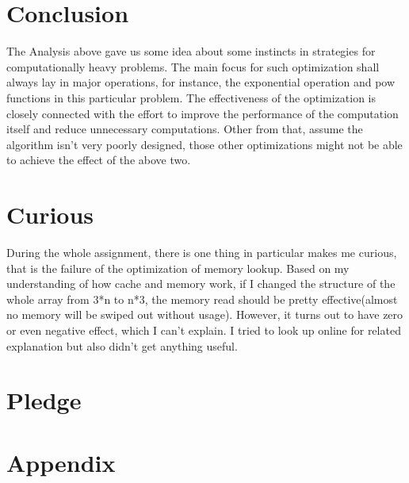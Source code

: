 \documentclass{cs4444}
\begin{document}
	   
\section{Conclusion}
	The Analysis above gave us some idea about some instincts in strategies for computationally heavy problems. The main focus for such optimization shall always lay in major operations, for instance, the exponential operation and pow functions in this particular problem. The effectiveness of the optimization is closely connected with the effort to improve the performance of the computation itself and reduce unnecessary computations. Other from that, assume the algorithm isn't very poorly designed, those other optimizations might not be able to achieve the effect of the above two.

\section{Curious}
	During the whole assignment, there is one thing in particular makes me curious, that is the failure of the optimization of memory lookup. Based on my understanding of how cache and memory work, if I changed the structure of the whole array from 3*n to n*3, the memory read should be pretty effective(almost no memory will be swiped out without usage). However, it turns out to have zero or even negative effect, which I can't explain. I tried to look up online for related explanation but also didn't get anything useful.

\section{Pledge}

\pledge
\newpage
\section{Appendix}


\end{document}
